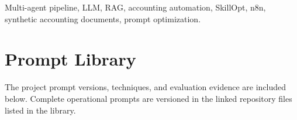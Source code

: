 \documentclass[journal,10pt,twoside]{IEEEtran}
\begin{document}
\begin{IEEEkeywords}
Multi-agent pipeline, LLM, RAG, accounting automation, SkillOpt, n8n,
synthetic accounting documents, prompt optimization.
\end{IEEEkeywords}
















\appendices
\section{Prompt Library}
The project prompt versions, techniques, and evaluation evidence are included
below. Complete operational prompts are versioned in the linked repository
files listed in the library.

\end{document}
